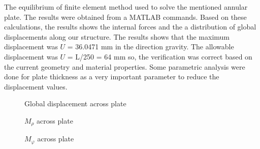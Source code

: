 The equilibrium of finite element method used to solve the mentioned annular
plate. The results were obtained from a MATLAB commands. Based on these
calculations, the results shows the internal forces and the a distribution of
global displacements along our structure. The results shows that the maximum
displacement was $U$ = 36.0471 mm in the direction gravity. The allowable
displacement was $U$ = L/250 = 64 mm so, the verification was correct
based on the current geometry and material properties. Some parametric analysis
were done for plate thickness as a very important parameter to reduce the
displacement values.
\begin{figure}[H]
    \centering
        
\end{figure}
\begin{figure}[H]
    \centering
    
    \caption{ Global displacement across plate }
    \label{fig:UglobFull}
\end{figure}
\begin{figure}[H]
    \centering
    
    \caption{ $M_{\rho}$ across plate }
    \label{fig:UglobFull}
\end{figure}
\begin{figure}[H]
    \centering
    
    \caption{ $M_{\varphi}$ across plate }
    \label{fig:UglobFull}
\end{figure}